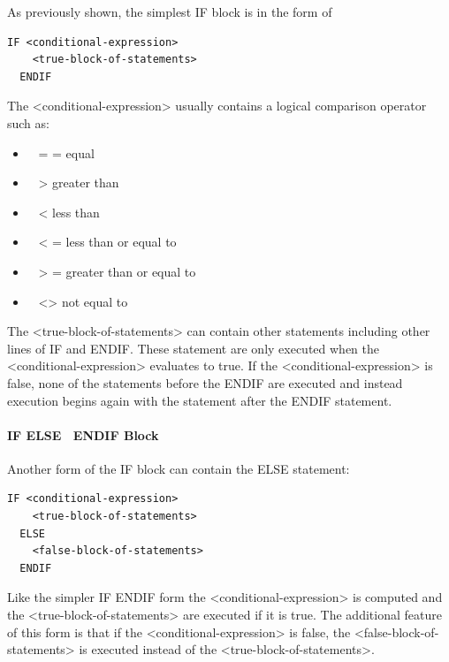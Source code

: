 As previously shown, the simplest IF block is in the form of

\begin{lstlisting}
IF <conditional-expression>
    <true-block-of-statements>
  ENDIF
\end{lstlisting}

The \textless{}conditional-expression\textgreater{} usually contains a logical comparison operator such as:

\begin{itemize}
\item
  ~ = = equal
\item
  ~ \textgreater{} greater than
\item
  ~ \textless{} less than
\item
  ~ \textless{} = less than or equal to
\item
  ~ \textgreater{} = greater than or equal to
\item
  ~ \textless{}\textgreater{} not equal to
\end{itemize}

The \textless{}true-block-of-statements\textgreater{} can contain other statements including other lines of IF and ENDIF. These statement are only executed when the \textless{}conditional-expression\textgreater{} evaluates to true. If the \textless{}conditional-expression\textgreater{} is false, none of the statements before the ENDIF are executed and instead execution begins again with the statement after the ENDIF statement.

\paragraph{IF ELSE~ ENDIF Block}\label{if-else-endif-block}

Another form of the IF block can contain the ELSE statement:

\begin{lstlisting}
IF <conditional-expression>
    <true-block-of-statements>
  ELSE
    <false-block-of-statements>
  ENDIF
\end{lstlisting}

Like the simpler IF ENDIF form the \textless{}conditional-expression\textgreater{} is computed and the \textless{}true-block-of-statements\textgreater{} are executed if it is true. The additional feature of this form is that if the \textless{}conditional-expression\textgreater{} is false, the \textless{}false-block-of-statements\textgreater{} is executed instead of the \textless{}true-block-of-statements\textgreater{}.

